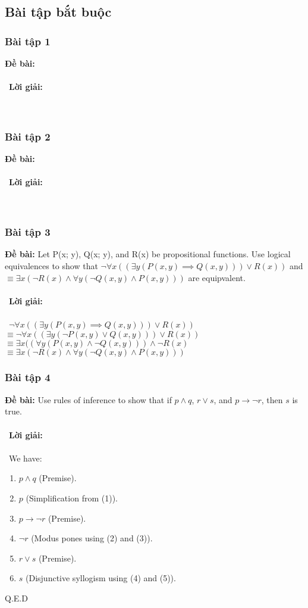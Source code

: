 \documentclass[a4paper]{article}
\begin{document}
\subsection{Bài tập bắt buộc}
\subsubsection{Bài tập 1}
\textbf{Đề bài:} 
\\\ \\\
\textbf{Lời giải:} \\\ \\\
\clearpage
\subsubsection{Bài tập 2}
\textbf{Đề bài:} 
\\\ \\\
\textbf{Lời giải:} \\\ \\\
\clearpage
\subsubsection{Bài tập 3}
\textbf{Đề bài:} Let P(x; y), Q(x; y), and R(x) be propositional functions. Use logical equivalences to show that $\lnot \forall x ((\exists y (P(x,y) \implies Q(x,y))) \lor R(x))$ and $\equiv \exists x (\lnot R(x) \land \forall y (\lnot Q(x,y) \land P(x,y)))$ are equipvalent.
\\\ \\\
\textbf{Lời giải:} \\\ \\\
$\lnot \forall x ((\exists y (P(x,y) \implies Q(x,y))) \lor R(x))$\\
$\equiv \lnot \forall x ((\exists y (\lnot P(x,y) \lor Q(x,y))) \lor R(x))$\\
$\equiv \exists x ((\forall y (P(x,y) \land \lnot Q(x,y))) \land \lnot R(x)$\\
$\equiv \exists x (\lnot R(x) \land \forall y (\lnot Q(x,y) \land P(x,y)))$\\
\clearpage
\subsubsection{Bài tập 4}
\textbf{Đề bài:} Use rules of inference to show that if $p \land q$, $r \lor s$, and $p \rightarrow \lnot r$, then $s$ is true. \\\ \\\
\textbf{Lời giải:} \\\ \\\
We have:
\begin{enumerate}
\item $p \land q$ (Premise).
\item $p$ (Simplification from (1)).
\item $p \rightarrow \lnot r$ (Premise).
\item $\lnot r$ (Modus pones using (2) and (3)).
\item $r \lor s$ (Premise).
\item $s$ (Disjunctive syllogism using (4) and (5)).
\end{enumerate}
Q.E.D
\end{document}
